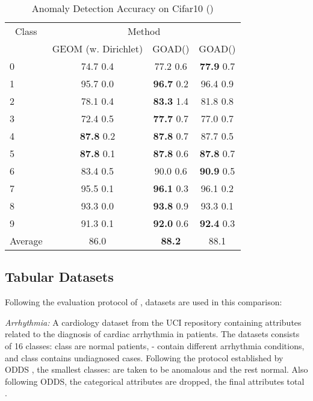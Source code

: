 \documentclass{article} \usepackage{iclr2020_conference,times}
\begin{document}
\begin{table}[t]
  \centering
      
  \caption{Anomaly Detection Accuracy on Cifar10 ()}
  \label{tab:cifar10_s_comp}

    \begin{tabular}{lccc}
    \toprule      

    \multicolumn{1}{c}{Class} & \multicolumn{3}{c}{Method} \\
   & GEOM (w. Dirichlet) & GOAD() & GOAD() \\
    \midrule
   0 & 74.7  0.4 & 77.2  0.6 & \textbf{77.9}  0.7\\
   1 & 95.7  0.0 & \textbf{96.7}  0.2 & 96.4  0.9\\
   2 & 78.1  0.4 & \textbf{83.3}  1.4 & 81.8  0.8\\
   3 & 72.4  0.5 & \textbf{77.7}  0.7 & 77.0  0.7\\
   4 & \textbf{87.8}  0.2 & \textbf{87.8}  0.7 & 87.7  0.5\\
   5 & \textbf{87.8}  0.1 & \textbf{87.8}  0.6 & \textbf{87.8}  0.7\\
   6 & 83.4  0.5 & 90.0  0.6 & \textbf{90.9}  0.5\\
   7 & 95.5  0.1 & \textbf{96.1}  0.3 & 96.1  0.2\\
   8 & 93.3  0.0 & \textbf{93.8}  0.9 & 93.3  0.1\\
   9 & 91.3  0.1 & \textbf{92.0}  0.6 & \textbf{92.4}  0.3\\
   \midrule
   Average & 86.0 & \textbf{88.2}  & 88.1\\
	 \bottomrule
    \end{tabular}

\end{table}



\subsection{Tabular Datasets}
\label{app:tabular_datasets}

Following the evaluation protocol of \cite{zong2018deep},  datasets are used in this comparison:

\textit{Arrhythmia:} A cardiology dataset from the UCI repository \citep{asuncion2007uci} containing attributes related to the diagnosis of cardiac arrhythmia in patients. The datasets consists of 16 classes: class  are normal patients, - contain different arrhythmia conditions, and class  contains undiagnosed cases. Following the protocol established by ODDS \citep{Rayana:2016}, the smallest classes:  are taken to be anomalous and the rest normal. Also following ODDS, the categorical attributes are dropped, the final attributes total .
\end{document}
